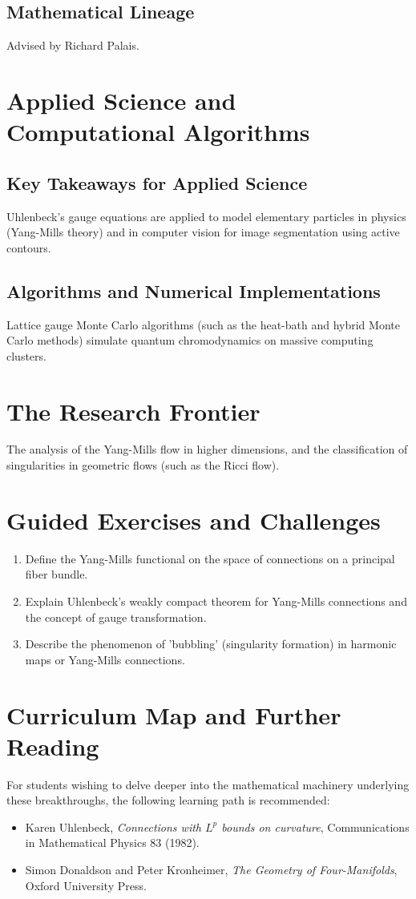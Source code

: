 \subsection{Mathematical Lineage}
Advised by Richard Palais.

\section{Applied Science and Computational Algorithms}
\subsection{Key Takeaways for Applied Science}
Uhlenbeck's gauge equations are applied to model elementary particles in physics (Yang-Mills theory) and in computer vision for image segmentation using active contours.

\subsection{Algorithms and Numerical Implementations}
Lattice gauge Monte Carlo algorithms (such as the heat-bath and hybrid Monte Carlo methods) simulate quantum chromodynamics on massive computing clusters.

\section{The Research Frontier}
The analysis of the Yang-Mills flow in higher dimensions, and the classification of singularities in geometric flows (such as the Ricci flow).

\section{Guided Exercises and Challenges}
\begin{enumerate}[label=\textbf{\arabic*.}]
  \item Define the Yang-Mills functional on the space of connections on a principal fiber bundle.
  \item Explain Uhlenbeck's weakly compact theorem for Yang-Mills connections and the concept of gauge transformation.
  \item Describe the phenomenon of 'bubbling' (singularity formation) in harmonic maps or Yang-Mills connections.
\end{enumerate}

\section{Curriculum Map and Further Reading}
For students wishing to delve deeper into the mathematical machinery underlying these breakthroughs, the following learning path is recommended:
\begin{itemize}
  \item Karen Uhlenbeck, \emph{Connections with $L^p$ bounds on curvature}, Communications in Mathematical Physics 83 (1982).
  \item Simon Donaldson and Peter Kronheimer, \emph{The Geometry of Four-Manifolds}, Oxford University Press.
\end{itemize}

